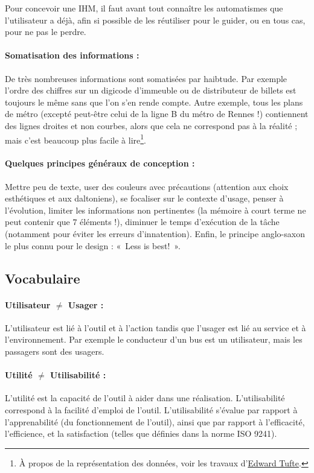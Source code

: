 \documentclass[10pt]{article}
\begin{document}
Pour concevoir une IHM, il faut avant tout connaître les automatismes que l'utilisateur a déjà,
afin si possible de les réutiliser pour le guider, ou en tous cas, pour ne pas le perdre.

\paragraph{Somatisation des informations :}
De très nombreuses informations sont somatisées par haibtude. Par exemple l'ordre des chiffres sur un digicode
d'immeuble ou de distributeur de billets est toujours le même sans que l'on s'en rende compte.
Autre exemple, tous les plans de métro (excepté peut-être celui de la ligne B du métro de Rennes !)
contiennent des lignes droites et non courbes, alors que cela ne correspond pas à la réalité ; mais c'est
beaucoup plus facile à lire\footnote{À propos de la représentation des données, voir les travaux d'\href{https://en.wikipedia.org/wiki/Edward_Tufte}{Edward Tufte}.}.

\paragraph{Quelques principes généraux de conception :}
Mettre peu de texte, user des couleurs avec précautions (attention aux choix esthétiques et aux daltoniens),
se focaliser sur le contexte d'usage, penser à l'évolution, limiter les informations non pertinentes
(la mémoire à court terme ne peut contenir que $7$ éléments !), diminuer le temps d'exécution de la tâche
(notamment pour éviter les erreurs d'innatention). Enfin, le principe anglo-saxon
le plus connu pour le design : «~Less is best!~».


\subsection{Vocabulaire}

\paragraph{Utilisateur $\neq$ Usager :}
L'utilisateur est lié à l'outil et à l'action tandis que l'usager est lié au service et à l'environnement.
Par exemple le conducteur d'un bus est un utilisateur, mais les passagers sont des usagers.

\paragraph{Utilité $\neq$ Utilisabilité :}
L'utilité est la capacité de l'outil à aider dans une réalisation. L'utilisabilité correspond à la
facilité d'emploi de l'outil. L'utilisabilité s'évalue par rapport à l'apprenabilité (du fonctionnement
de l'outil), ainsi que par rapport à l'efficacité, l'efficience, et la satisfaction (telles que définies
dans la norme ISO 9241).
\end{document}
